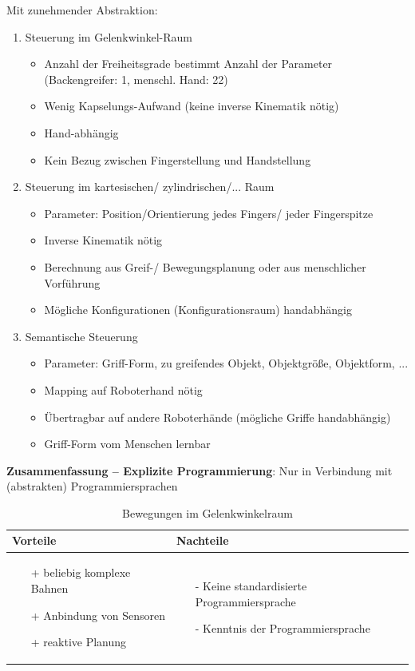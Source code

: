 Mit zunehmender Abstraktion:
\begin{enumerate}
\item Steuerung im Gelenkwinkel-Raum
\begin{itemize}
\item Anzahl der Freiheitsgrade bestimmt Anzahl der Parameter (Backengreifer: 1, menschl. Hand: 22)
\item Wenig Kapselungs-Aufwand (keine inverse Kinematik nötig) 
\item Hand-abhängig
\item Kein Bezug zwischen Fingerstellung und Handstellung
\end{itemize}
\item Steuerung im kartesischen/ zylindrischen/... Raum
\begin{itemize}
\item Parameter: Position/Orientierung jedes Fingers/ jeder Fingerspitze
\item Inverse Kinematik nötig
\item Berechnung aus Greif-/ Bewegungsplanung oder aus menschlicher Vorführung
\item Mögliche Konfigurationen (Konfigurationsraum) handabhängig
\end{itemize}
\item Semantische Steuerung
\begin{itemize}
\item Parameter: Griff-Form, zu greifendes Objekt, Objektgröße, Objektform, ...
\item Mapping auf Roboterhand nötig
\item Übertragbar auf andere Roboterhände (mögliche Griffe handabhängig)
\item Griff-Form vom Menschen lernbar
\end{itemize}
\end{enumerate}
\textbf{Zusammenfassung -- Explizite Programmierung}: Nur in Verbindung mit (abstrakten) Programmiersprachen
\begin{table}[hbt]
\centering
\begin{tabular}{|p{7.5cm}|p{7.5cm}|}
\hline
Vorteile & Nachteile\\
\hline
\vspace{-5mm}
\begin{itemize}
\setlength\itemsep{0em}
\item[+] beliebig komplexe Bahnen
\item[+] Anbindung von Sensoren
\item[+] reaktive Planung
\end{itemize}
 &
 \vspace{-5mm}
\begin{itemize}
\setlength\itemsep{0em}
\item[-] Keine standardisierte Programmiersprache
\item[-] Kenntnis der Programmiersprache
\end{itemize}\\
\hline
\end{tabular}
\caption{Bewegungen im Gelenkwinkelraum}
\label{tab:bew}
\end{table}
